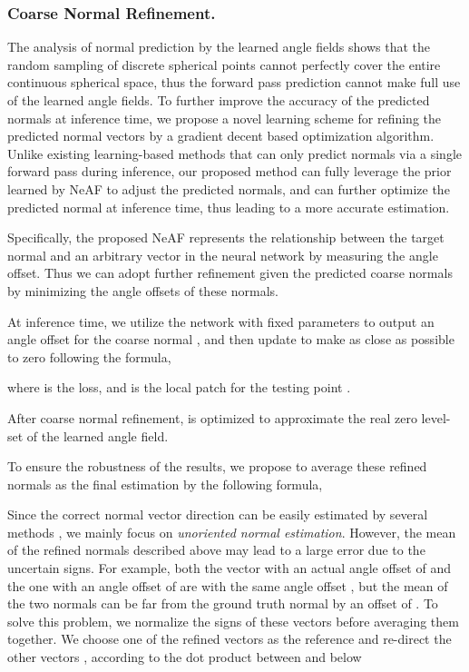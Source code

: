 \documentclass[letterpaper]{article} \usepackage{aaai23}  \usepackage{times}  \usepackage{helvet}  \usepackage{courier}  \usepackage[hyphens]{url}  \usepackage{graphicx} \urlstyle{rm} \def\UrlFont{\rm}  \usepackage{natbib}  \usepackage{caption} \frenchspacing  \setlength{\pdfpagewidth}{8.5in} \setlength{\pdfpageheight}{11in} \usepackage{algorithm}
\begin{document}
\subsubsection{Coarse Normal Refinement.}
The analysis of normal prediction by the learned angle fields shows that the random sampling of discrete spherical points cannot perfectly cover the entire continuous spherical space, thus the forward pass prediction cannot make full use of the learned angle fields.
To further improve the accuracy of the predicted normals at inference time, we propose a novel learning scheme for refining the predicted normal vectors by a gradient decent based optimization algorithm. Unlike existing learning-based methods that can only predict normals via a single forward pass during inference, our proposed method can fully leverage the prior learned by NeAF to adjust the predicted normals, and can further optimize the predicted normal at inference time, thus leading to a more accurate estimation.

Specifically, the proposed NeAF represents the relationship between the target normal and an arbitrary vector in the neural network by measuring the angle offset. Thus we can adopt further refinement given the predicted coarse normals by minimizing the angle offsets of these normals.

At inference time, we utilize the network  with fixed parameters to output an angle offset  for the coarse normal , and then update  to make  as close as possible to zero following the formula,

where  is the  loss, and  is the local patch for the testing point .

After coarse normal refinement,  is optimized to approximate the real zero level-set of the learned angle field. 

To ensure the robustness of the results, we propose to average these refined normals  as the final estimation  by the following formula,


Since the correct normal vector direction can be easily estimated by several methods \cite{mullen2010signing,  wu2015deep, huang2019learning, metzer2021orienting}, we mainly focus on \emph{unoriented normal estimation}. However, the mean of the refined normals described above may lead to a large error due to the uncertain signs. For example, both the vector with an actual angle offset of  and the one with an angle offset of  are with the same angle offset , but the mean of the two normals can be far from the ground truth normal by an offset of . To solve this problem, we normalize the signs of these vectors before averaging them together. We choose one of the refined vectors  as the reference  and re-direct the other vectors , according to the dot product between  and  below
\end{document}
